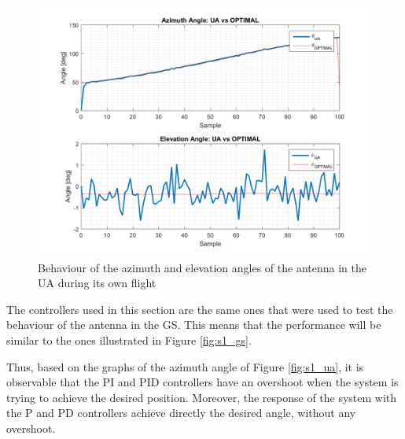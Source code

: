 \begin{figure}[H]
	\centering
	\includegraphics[scale=0.75]{figures/s1_pd_ua.png}
	\caption{Behaviour of the azimuth and elevation angles of the antenna in the UA during its own flight}
	\label{fig:s1_pd_ua_alone}
\end{figure}

The controllers used in this section are the same ones that were used to test the behaviour of the antenna in the GS. This means that the performance will be similar to the ones illustrated in Figure \ref{fig:s1_gs}.

Thus, based on the graphs of the azimuth angle of Figure \ref{fig:s1_ua}, it is observable that the PI and PID controllers have an overshoot when the system is trying to achieve the desired position. Moreover, the response of the system with the P and PD controllers achieve directly the desired angle, without any overshoot.

